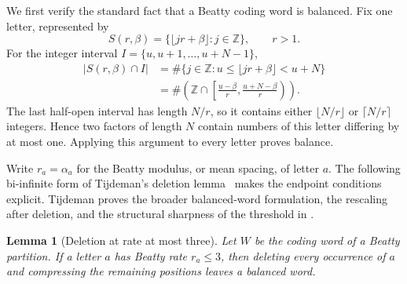 \documentclass[11pt]{article}
\newtheorem{lemma}[theorem]{Lemma}
\theoremstyle{definition}
\theoremstyle{remark}
\newcommand{\Z}{\mathbb Z}
\begin{document}
We first verify the standard fact that a Beatty coding word is balanced.
Fix one letter, represented by
\[
 S(r,\beta)=\{\lfloor jr+\beta\rfloor:j\in\Z\},\qquad r>1.
\]
For the integer interval \(I=\{u,u+1,\ldots,u+N-1\}\),
\begin{align*}
 |S(r,\beta)\cap I|
 &=\#\{j\in\Z:u\le\lfloor jr+\beta\rfloor<u+N\}\\
 &=\#\left(\Z\cap
   \left[\frac{u-\beta}{r},\frac{u+N-\beta}{r}\right)\right).
\end{align*}
The last half-open interval has length \(N/r\), so it contains either
\(\lfloor N/r\rfloor\) or \(\lceil N/r\rceil\) integers.  Hence two
factors of length \(N\) contain numbers of this letter differing by at most
one.  Applying this argument to every letter proves balance.

Write \(r_a=\alpha_a\) for the Beatty modulus, or mean spacing, of letter
\(a\).  The following bi-infinite form of Tijdeman's deletion
lemma~\cite[Lemma~3]{Tijdeman2000} makes the endpoint conditions explicit.
Tijdeman proves the broader balanced-word formulation, the rescaling after
deletion, and the structural sharpness of the threshold in
\cite[Lemma~6 and Remarks~2--3]{TijdemanBalanced2000}.

\begin{lemma}[Deletion at rate at most three]\label{lem:deletion}
Let \(W\) be the coding word of a Beatty partition.  If a letter \(a\) has
Beatty rate \(r_a\le3\), then deleting every occurrence of \(a\) and
compressing the remaining positions leaves a balanced word.
\end{lemma}
\end{document}
